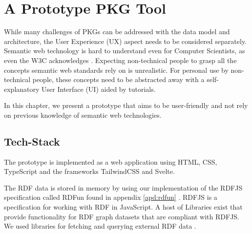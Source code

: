 \chapter{A Prototype PKG Tool} \label{ch:prototype}

While many challenges of PKGs can be addressed with the data model and architecture, the User Experience (UX) aspect needs to be considered separately. Semantic web technology is hard to understand even for Computer Scientists, as even the W3C acknowledges \cite{EasierRDF}. Expecting non-technical people to grasp all the concepts semantic web standards rely on is unrealistic. For personal use by non-technical people, these concepts need to be abstracted away with a self-explanatory User Interface (UI) aided by tutorials. 

In this chapter, we present a prototype that aims to be user-friendly and not rely on previous knowledge of semantic web technologies.

\section{Tech-Stack}

The prototype is implemented as a web application using HTML, CSS, TypeScript and the frameworks TailwindCSS and Svelte. 

The RDF data is stored in memory by using our implementation of the RDFJS specification called RDFun found in appendix \ref{apd:rdfun} \cite{rdfjs}. RDFJS is a specification for working with RDF in JavaScript. A host of Libraries exist that provide functionality for RDF graph datasets that are compliant with RDFJS. We used libraries for fetching and querying external RDF data \cite{comunica}.

